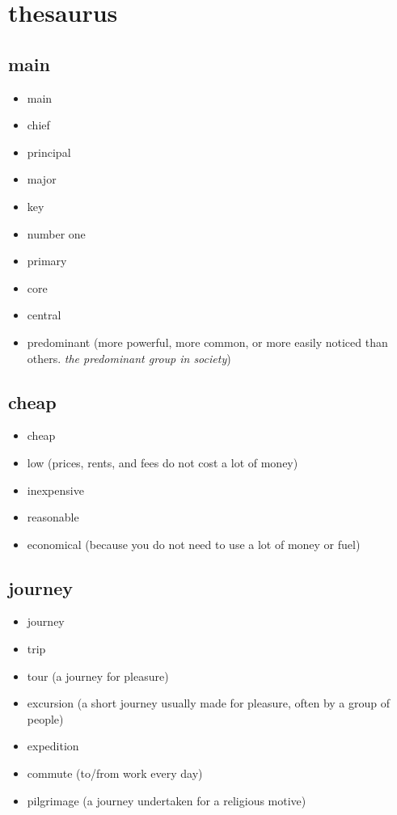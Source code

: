 \chapter{thesaurus}

\section{main}
\begin{itemize}
    \item main
    \item chief
    \item principal
    \item major
    \item key
    \item number one
    \item primary
    \item core
    \item central
    \item predominant (more powerful, more common, or more easily noticed than others. \textit{the predominant group in society})
\end{itemize}

\section{cheap}
\begin{itemize}
    \item cheap
    \item low (prices, rents, and fees do not cost a lot of money)
    \item inexpensive
    \item reasonable
    \item economical (because you do not need to use a lot of money or fuel)
\end{itemize}

\section{journey}
\begin{itemize}
    \item journey
    \item trip
    \item tour (a journey for pleasure)
    \item excursion (a short journey usually made for pleasure, often by a group of people)
    \item expedition
    \item commute (to/from work every day)
    \item pilgrimage (a journey undertaken for a religious motive)
\end{itemize}

